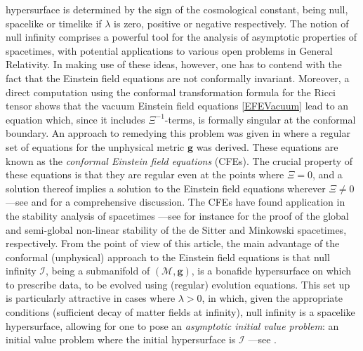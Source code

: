 \documentclass[10pt,a4paper]{article}
\theoremstyle{plain}
\def\bmg{{\bm g}}
\begin{document}
hypersurface is determined by the sign of the cosmological constant,
being null, spacelike or timelike if $\lambda$ is zero, positive or
negative respectively. The notion of null infinity comprises a powerful tool
for the analysis of asymptotic properties of spacetimes, with potential applications to various open problems in General Relativity.
In making use of these ideas, however, one has to contend with the fact that the Einstein field
equations are not conformally invariant. Moreover, a direct
computation using the conformal transformation formula for the Ricci
tensor shows that the vacuum Einstein field equations
\eqref{EFEVacuum} lead to an equation which, since it includes $\Xi^{-1}$-terms, is formally singular at
the conformal boundary. An approach to remedying this problem was
given in \cite{Fri81a} where a regular set of equations for the
unphysical metric $\bmg$ was derived. These equations are known as the
\emph{conformal Einstein field equations} (CFEs).  The crucial
property of these equations is that they are regular even at the points
where $\Xi=0$, and a solution thereof implies a
solution to the Einstein field equations wherever $\Xi\neq 0$ ---see \cite{Fri81a,Fri83}
and \cite{CFEbook} for a comprehensive discussion. 
The CFEs have found application in
the stability analysis of spacetimes ---see for instance \cite{Fri86b,
  Fri86c} for the proof of the global and semi-global non-linear
stability of the de Sitter and Minkowski spacetimes, respectively.
From the point of view of this article, the main advantage of the conformal
(unphysical) approach to the Einstein field equations is that null
infinity $\mathscr{I}$, being a submanifold of $(\mathcal{M},\bmg)$, is a bonafide hypersurface on which to prescribe data, to be evolved using
(regular) evolution equations. This set
up is particularly attractive in cases where $\lambda>0$, in
which, given the appropriate conditions (sufficient decay of matter fields
at infinity), null infinity is a spacelike hypersurface, allowing for one to pose an \emph{asymptotic initial value problem}: an
initial value problem where the initial hypersurface is $\mathscr{I}$
---see \cite{GasVal17,MarPaeSenSim16, LueVal09}.

\medskip
\end{document}
